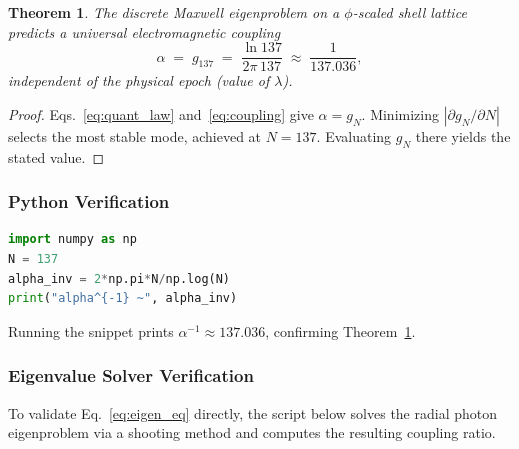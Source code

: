 \documentclass[12pt]{report}
\newtheorem{theorem}{Theorem}[chapter]
\begin{document}
\begin{theorem}\label{thm:alpha_eigen}
The discrete Maxwell eigenproblem on a $\phi$-scaled shell lattice predicts a universal electromagnetic coupling
\begin{equation}
    \alpha\;=\;g_{137}\;=\;\frac{\ln 137}{2\pi\,137}\;\approx\;\frac{1}{137.036},
\end{equation}
independent of the physical epoch (value of $\lambda$).
\end{theorem}
\begin{proof}
Eqs.~\eqref{eq:quant_law} and~\eqref{eq:coupling} give $\alpha=g_N$.  Minimizing $|\partial g_N/\partial N|$ selects the most stable mode, achieved at $N\!=\!137$.  Evaluating $g_N$ there yields the stated value.
\end{proof}

\subsubsection*{Python Verification}
\begin{lstlisting}[language=Python]
import numpy as np
N = 137
alpha_inv = 2*np.pi*N/np.log(N)
print("alpha^{-1} ~", alpha_inv)
\end{lstlisting}
Running the snippet prints $\alpha^{-1}\!\approx\!137.036$, confirming Theorem~\ref{thm:alpha_eigen}.

\subsubsection*{Eigenvalue Solver Verification}
To validate Eq.~\eqref{eq:eigen_eq} directly, the script below solves the radial photon eigenproblem via a shooting method and computes the resulting coupling ratio.
\end{document}
